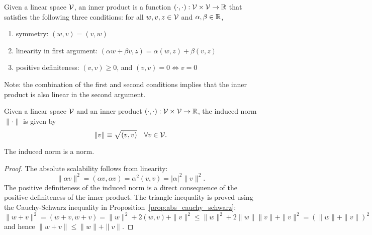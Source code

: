 \begin{definition}
  Given a linear space $\mathcal{V}$, an inner product is a function $(\cdot,\cdot): \mathcal{V} \times \mathcal{V} \to \mathbb{R}$ that satisfies the following three conditions: for all $w,v,z \in \mathcal{V}$ and $\alpha,\beta \in \mathbb{R}$,
\begin{enumerate}
\item symmetry: $(w,v) = (v,w)$
\item linearity in first argument: $ (\alpha w + \beta v, z) = \alpha (w,z) + \beta (v,z)$
\item positive definiteness: $ (v,v) \geq 0$, and $(v,v) = 0 \Leftrightarrow v = 0 $
\end{enumerate}
Note: the combination of the first and second conditions implies that the inner product is also linear in the second argument.
\end{definition}
\begin{definition}
  Given a linear space $\mathcal{V}$ and an inner product $(\cdot,\cdot): \mathcal{V} \times \mathcal{V} \to \mathbb{R}$, the induced norm $\| \cdot \|$ is given by
  \begin{equation*}
    \| v \| \equiv \sqrt{(v,v)} \quad \forall v \in \mathcal{V}.
  \end{equation*}
\end{definition}
\begin{remark}
  The induced norm is a norm.
  \begin{proof}
     The absolute scalability follows from linearity:
     \begin{equation*}
       \| \alpha v \|^2 = (\alpha v, \alpha v) = \alpha^2 (v,v) = |\alpha|^2 \| v \|^2.
     \end{equation*}
     The positive definiteness of the induced norm is a direct consequence of the positive definiteness of the inner product.  The triangle inequality is proved using the Cauchy-Schwarz inequality in Proposition~\ref{prop:abs_cauchy_schwarz}:
     \begin{equation*}
       \| w + v \|^2
       = (w + v, w+ v)
       = \| w \|^2 + 2(w,v) + \| v \|^2
       \leq \| w \|^2 + 2 \| w \| \| v \| + \| v \|^2
       =  (\| w \| + \| v \|)^2
     \end{equation*}
     and hence $\| w + v \| \leq \| w \| + \| v \|$.
  \end{proof}
\end{remark}
